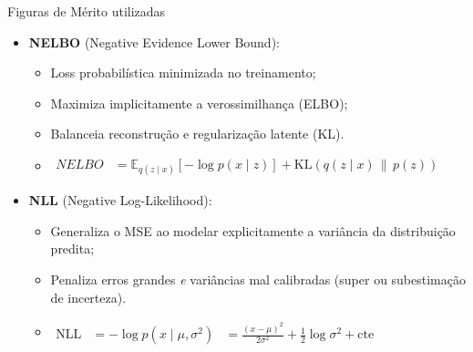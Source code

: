 \documentclass[10pt,aspectratio=169]{beamer}
\begin{document}
\begin{frame}{Figuras de Mérito utilizadas}
  \begin{itemize}
   \item \textbf{NELBO} (Negative Evidence Lower Bound):
\begin{itemize}
  \item Loss probabilística minimizada no treinamento;
  \item Maximiza implicitamente a verossimilhança (ELBO);
  \item Balanceia reconstrução e regularização latente (KL).
\item
\(
\begin{aligned}
NELBO
&=
\mathbb{E}_{q(z\mid x)}
\!\left[
- \log p(x \mid z)
\right]
+
\mathrm{KL}\!\left(
q(z\mid x)\,\|\,p(z)
\right)
\end{aligned}
\)


\end{itemize}

\item \textbf{NLL} (Negative Log-Likelihood):
  \begin{itemize}
    \item Generaliza o MSE ao modelar explicitamente a variância
          da distribuição predita;
    \item Penaliza erros grandes \emph{e} variâncias mal calibradas
          (super ou subestimação de incerteza).
\item 
\(
\begin{aligned}
\text{NLL}
&=
- \log p(x \mid \mu, \sigma^2)
&=
\frac{(x-\mu)^2}{2\sigma^2}
+ \frac{1}{2}\log\sigma^2
+ \text{cte}
\end{aligned}
\)



  \end{itemize}
    \end{itemize}
\end{frame}
\end{document}
